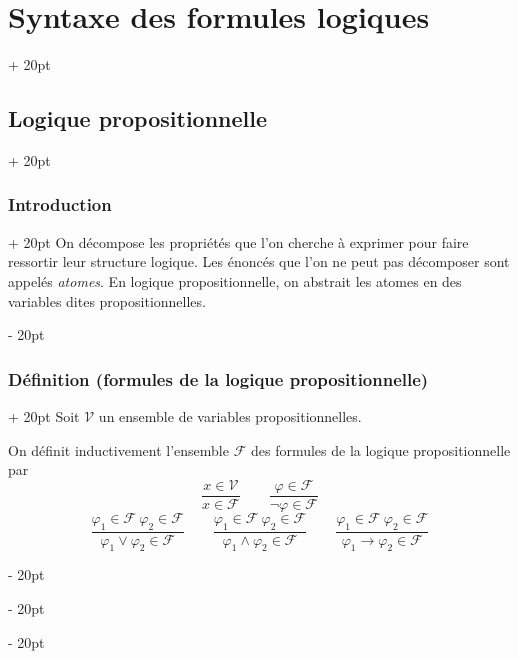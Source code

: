 \documentclass[a4paper, 12pt, twoside]{article}
\newcommand{\ind}[1][20pt]{\advance\leftskip + #1}
\newcommand{\deind}[1][20pt]{\advance\leftskip - #1}
\newenvironment{indt}[2][20pt]{#2 \par \ind[#1]}{\par \deind} %
\begin{document}
    \begin{indt}{\section{Syntaxe des formules logiques}}
        
        \begin{indt}{\subsection{Logique propositionnelle}}
            \begin{indt}{\subsubsection{Introduction}}
                On décompose les propriétés que l'on cherche à exprimer pour faire ressortir leur structure logique. Les énoncés que l'on ne peut pas décomposer sont appelés \textit{atomes}. En logique propositionnelle, on abstrait les atomes en des variables dites propositionnelles.
            \end{indt}
            
            \vspace{12pt}
            
            \begin{indt}{\subsubsection{Définition (formules de la logique propositionnelle)}}
                Soit $\mathcal V$ un ensemble de variables propositionnelles.
                
                On définit inductivement l'ensemble $\mathcal F$ des formules de la logique propositionnelle par
                    \[
                        \dfrac{x \in \mathcal V}{x \in \mathcal F}
                        \qquad
                        \dfrac{\varphi \in \mathcal F}{\neg \varphi \in \mathcal F}
                    \]
                    \[
                        \dfrac{\varphi_1 \in \mathcal F\ \varphi_2 \in \mathcal F}{\varphi_1 \vee \varphi_2 \in \mathcal F}
                        \qquad
                        \dfrac{\varphi_1 \in \mathcal F\ \varphi_2 \in \mathcal F}{\varphi_1 \wedge \varphi_2 \in \mathcal F}
                        \qquad
                        \dfrac{\varphi_1 \in \mathcal F\ \varphi_2 \in \mathcal F}{\varphi_1 \rightarrow \varphi_2 \in \mathcal F}
                    \]
                

\end{indt}
\end{indt}
\end{indt}
\end{document}
